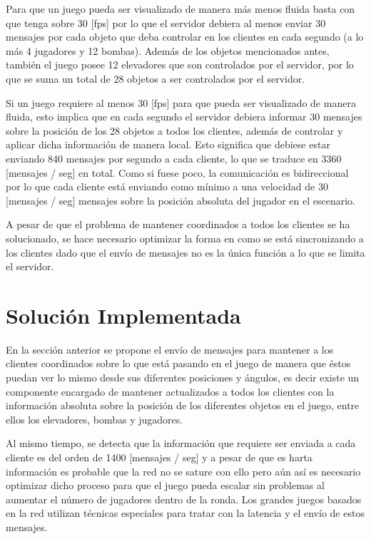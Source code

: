 \documentclass[a4paper,12pt,openany,oneside]{book}
\begin{document}
Para que un juego pueda ser visualizado de manera más menos fluida basta con que tenga sobre 30 [fps] \cite{VALVE1} por lo que el servidor debiera al menos enviar 30 mensajes por cada objeto que deba controlar en los clientes en cada segundo (a lo más 4 jugadores y 12 bombas). Además de los objetos mencionados antes, también el juego posee 12 elevadores que son controlados por el servidor, por lo que se suma un total de 28 objetos a ser controlados por el servidor.

Si un juego requiere al menos 30 [fps] para que pueda ser visualizado de manera fluida, esto implica que en cada segundo el servidor debiera informar 30 mensajes sobre la posición de los 28 objetos a todos los clientes, además de controlar y aplicar dicha información de manera local. Esto significa que debiese estar enviando 840 mensajes por segundo a cada cliente, lo que se traduce en 3360 [mensajes / seg] en total. Como si fuese poco, la comunicación es bidireccional por lo que cada cliente está enviando como mínimo a una velocidad de 30 [mensajes / seg] mensajes sobre la posición absoluta del jugador en el escenario.

A pesar de que el problema de mantener coordinados a todos los clientes se ha solucionado, se hace necesario optimizar la forma en como se está sincronizando a los clientes dado que el envío de mensajes no es la única función a lo que se limita el servidor. 
\section{Solución Implementada}
En la sección anterior se propone el envío de mensajes para mantener a los clientes coordinados sobre lo que está pasando en el juego de manera que éstos puedan ver lo mismo desde sus diferentes posiciones y ángulos, es decir existe un componente encargado de mantener actualizados a todos los clientes con la información absoluta sobre la posición de los diferentes objetos en el juego, entre ellos los elevadores, bombas y jugadores.

Al mismo tiempo, se detecta que la información que requiere ser enviada a cada cliente es del orden de 1400 [mensajes / seg] y a pesar de que es harta información es probable que la red no se sature con ello pero aún así es necesario optimizar dicho proceso para que el juego pueda escalar sin problemas al aumentar el número de jugadores dentro de la ronda. Los grandes juegos basados en la red utilizan técnicas especiales para tratar con la latencia y el envío de estos mensajes.
\end{document}
